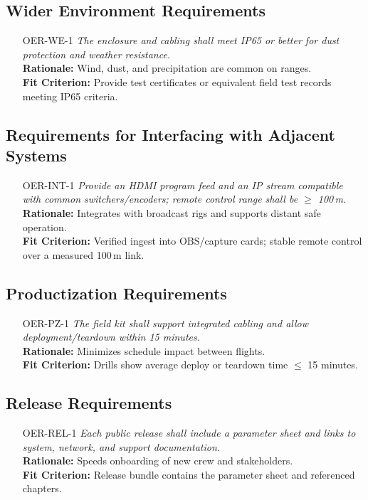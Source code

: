 \documentclass[12pt]{article}
\begin{document}
\subsection{Wider Environment Requirements}
\begin{itemize}[leftmargin=*]
  \item[OER-WE-1] \emph{The enclosure and cabling shall meet IP65 or better for dust
          protection and weather resistance.}\\ \textbf{Rationale:} Wind, dust, and
        precipitation are common on ranges.\\ \textbf{Fit Criterion:} Provide test
        certificates or equivalent field test records meeting IP65 criteria.
\end{itemize}

\subsection{Requirements for Interfacing with Adjacent Systems}
\begin{itemize}[leftmargin=*]
  \item[OER-INT-1] \emph{Provide an HDMI program feed and an IP stream compatible with
          common switchers/encoders; remote control range shall be $\geq$ 100\,m.}\\
        \textbf{Rationale:} Integrates with broadcast rigs and supports distant safe
        operation.\\ \textbf{Fit Criterion:} Verified ingest into OBS/capture cards;
        stable remote control over a measured 100\,m link.
\end{itemize}

\subsection{Productization Requirements}
\begin{itemize}[leftmargin=*]
  \item[OER-PZ-1] \emph{The field kit shall support integrated cabling and allow
          deployment/teardown within 15 minutes.}\\ \textbf{Rationale:} Minimizes
        schedule impact between flights.\\ \textbf{Fit Criterion:} Drills show average
        deploy or teardown time $\leq$ 15 minutes.
\end{itemize}

\subsection{Release Requirements}
\begin{itemize}[leftmargin=*]
  \item[OER-REL-1] \emph{Each public release shall include a parameter sheet and links
          to system, network, and support documentation.}\\ \textbf{Rationale:} Speeds
        onboarding of new crew and stakeholders.\\ \textbf{Fit Criterion:} Release
        bundle contains the parameter sheet and referenced chapters.
\end{itemize}
\end{document}
